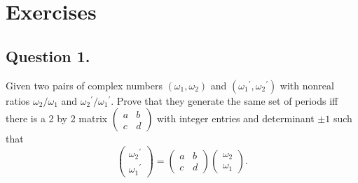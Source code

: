 \section{Exercises}

\subsection*{Question 1.}

\noindent
Given two pairs of complex numbers $(\omega_1, \omega_2)$ and $({\omega_1}^\prime, {\omega_2}^\prime)$ with nonreal
ratios $\omega_2 / \omega_1$ and ${\omega_2}^\prime / {\omega_1}^\prime$. Prove that they generate the same set of
periods iff there is a 2 by 2 matrix $\begin{pmatrix} a & b \\ c & d \end{pmatrix}$ with integer entries and
determinant $\pm 1$ such that \[
\begin{pmatrix} {\omega_2}^\prime \\ {\omega_1}^\prime \end{pmatrix} =
\begin{pmatrix} a & b \\ c & d \end{pmatrix} \begin{pmatrix} \omega_2 \\ \omega_1 \end{pmatrix}.
\]